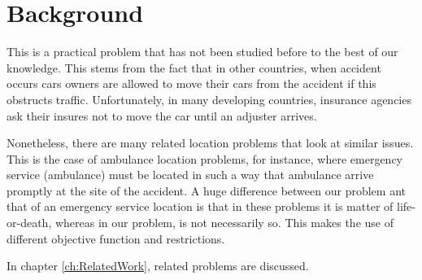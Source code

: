 \section{Background}
This is a practical problem
that has not been studied before
to the best of our knowledge.
This stems
from the fact
that in other countries,
when accident occurs
cars owners
are allowed to move their cars
from the accident
if this obstructs traffic.
Unfortunately,
in many developing countries,
insurance agencies
ask their insures
not to move the car
until an adjuster arrives.

Nonetheless,
there are many related location problems
that look at similar issues.
This is the case of
ambulance location problems,
for instance,
where emergency service (ambulance)
must be located
in such a way that
ambulance arrive promptly
at the site of the accident.
A huge difference
between our problem
ant that
of an emergency service location
is that in these problems
it is matter of life-or-death,
whereas in our problem,
is not necessarily so.
This makes
the use of different objective function
and restrictions.

In chapter \ref{ch:RelatedWork},
related problems are discussed.
